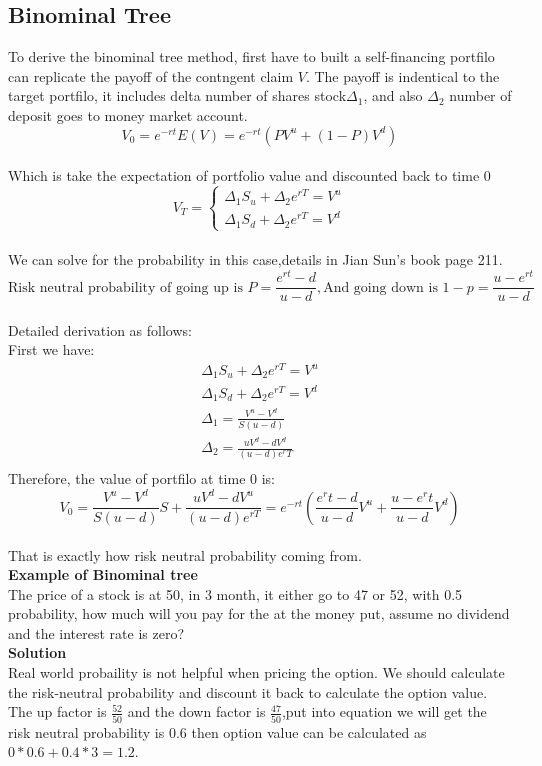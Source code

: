 \documentclass[a4paper,11pt]{article}
\begin{document}
\subsection{Binominal Tree}
To derive the binominal tree method, first have to built a self-financing portfilo can replicate the payoff of the contngent claim $V$. The payoff is indentical to the target portfilo, it includes delta number of shares stock$\Delta_1$, and also $\Delta_2$ number of deposit goes to money market account.\\
$$ V_0=e^{-rt}E(V)=e^{-rt}(PV^u+(1-P)V^d)$$ \\
Which is take the expectation of portfolio value and discounted back to time 0\\
$$
V_T=
\begin{cases}
  \Delta_1S_u+\Delta_2e^{rT}=V^u\\ \Delta_1S_d+\Delta_2e^{rT}=V^d
\end{cases}
$$\\
We can solve for the probability in this case,details in Jian Sun's book page 211.
$$\mbox {Risk neutral probability of going up is $P=\frac{e^{rt}-d}{u-d}$},
 \mbox{And going down is $1-p=\frac{u-e^{rt}}{u-d}$}$$ \\
Detailed derivation as follows:\\
First we have:\\
\begin{equation}
\begin{aligned}
\Delta_1S_u+\Delta_2e^{rT}=V^u\\
\Delta_1S_d+\Delta_2e^{rT}=V^d \\
\Delta_1=\frac{V^u-V^d}{S(u-d)}\\
\Delta_2=\frac{uV^d-dV^d}{(u-d)e^rT}\\
 \end{aligned}
\end{equation}
Therefore, the value of portfilo at time 0 is:
$$V_0=\frac{V^u-V^d}{S(u-d)}S+\frac{uV^d-dV^u}{(u-d)e^{rT}}=e^{-rt}\left(\frac{e^rt-d}{u-d}V^u+\frac{u-e^rt}{u-d}V^d\right)$$\\
That is exactly how risk neutral probability coming from.\\
{\bf Example of Binominal tree}\\
The price of a stock is at 50, in 3 month, it either go to 47 or 52, with 0.5 probability, how much will you pay for the at the money put, assume no dividend and the interest rate is zero?\\
{\bf Solution}\\
Real world probaility is not helpful when pricing the option. We should calculate the risk-neutral probability and discount it back to calculate the option value. The up factor is $\frac{52}{50}$ and the down factor is $\frac{47}{50}$,put into equation we will get the risk neutral probability is 0.6 then option value can be calculated as $0*0.6+0.4*3=1.2$.\\
\end{document}
